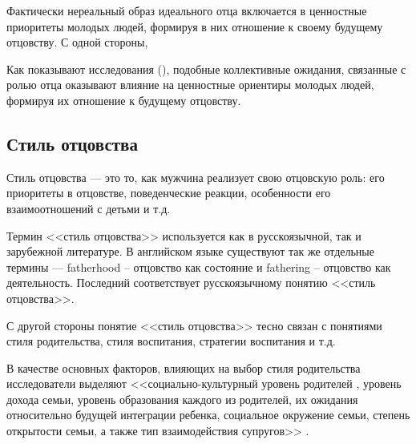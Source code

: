 \documentclass{../../common/thesisbyxetex}
\begin{document}
Фактически нереальный образ идеального отца включается в ценностные приоритеты молодых людей, 
формируя в них отношение к своему будущему отцовству. С одной стороны,
 
Как показывают исследования (\cite{imaf}), подобные коллективные ожидания, связанные с ролью отца 
оказывают влияние на ценностные ориентиры молодых людей, формируя их отношение к будущему 
отцовству. 







\subsection{Стиль отцовства}

Стиль отцовства --- это то, как мужчина реализует свою отцовскую роль: его приоритеты в отцовстве, 
поведенческие реакции, особенности его взаимоотношений с детьми и т.д.

Термин <<стиль отцовства>> используется как в русскоязычной, так и зарубежной литературе. В 
английском языке существуют так же отдельные термины --- fatherhood -- отцовство как 
состояние и fathering -- отцовство как деятельность. Последний соответствует русскоязычному понятию 
<<стиль отцовства>>.

С другой стороны понятие <<стиль отцовства>> тесно связан с понятиями стиля родительства, стиля 
воспитания, стратегии воспитания и т.д. 



В качестве основных факторов, влияющих на выбор стиля родительства исследователи выделяют  
<<социально-культурный уровень
родителей , уровень дохода семьи, уровень
образования каждого из родителей, их ожидания относительно будущей интеграции
ребенка, социальное окружение семьи, степень открытости семьи, а также тип
взаимодействия супругов>> \cite[286]{strat}.
\end{document}
